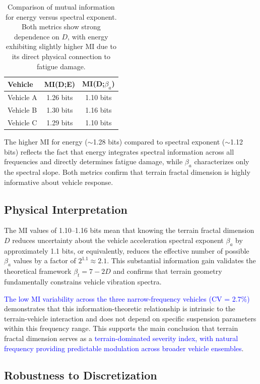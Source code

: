 \documentclass[11pt]{article}
\begin{document}
\begin{table}[h]
\centering
\begin{tabular}{lcc}
\hline
\textbf{Vehicle} & \textbf{MI(D;E)} & \textbf{MI(D;$\beta_a$)} \\
\hline
Vehicle A & 1.26 bits & 1.10 bits \\
Vehicle B & 1.30 bits & 1.16 bits \\
Vehicle C & 1.29 bits & 1.10 bits \\
\hline
\end{tabular}
\caption{Comparison of mutual information for energy versus spectral exponent. Both metrics show strong dependence on $D$, with energy exhibiting slightly higher MI due to its direct physical connection to fatigue damage.}
\end{table}

The higher MI for energy ($\sim$1.28 bits) compared to spectral exponent ($\sim$1.12 bits) reflects the fact that energy integrates spectral information across all frequencies and directly determines fatigue damage, while $\beta_a$ characterizes only the spectral slope. Both metrics confirm that terrain fractal dimension is highly informative about vehicle response.

\subsection{Physical Interpretation}

The MI values of 1.10--1.16 bits mean that knowing the terrain fractal dimension $D$ reduces uncertainty about the vehicle acceleration spectral exponent $\beta_a$ by approximately 1.1 bits, or equivalently, reduces the effective number of possible $\beta_a$ values by a factor of $2^{1.1} \approx 2.1$. This substantial information gain validates the theoretical framework $\beta_t = 7-2D$ and confirms that terrain geometry fundamentally constrains vehicle vibration spectra.

\textcolor{blue}{The low MI variability across the three narrow-frequency vehicles (CV = 2.7\%)} demonstrates that this information-theoretic relationship is intrinsic to the terrain-vehicle interaction and does not depend on specific suspension parameters within this frequency range. This supports the main conclusion that terrain fractal dimension serves as a \textcolor{blue}{terrain-dominated severity index, with natural frequency providing predictable modulation across broader vehicle ensembles}.

\subsection{Robustness to Discretization}
\end{document}
